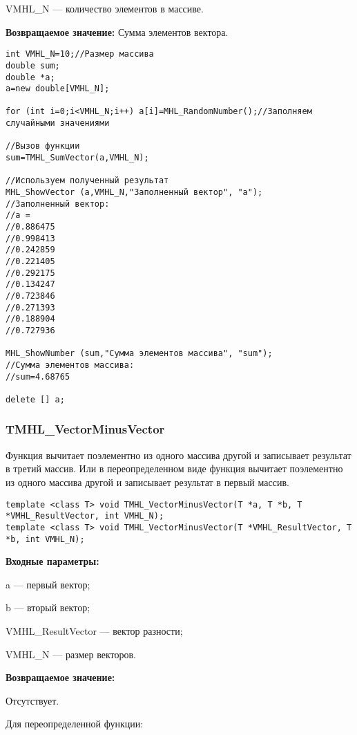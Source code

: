 \documentclass[a4paper,12pt]{article}
\begin{document}
 VMHL\_N --- количество элементов в массиве.

\textbf{Возвращаемое значение:}
Сумма элементов вектора.


\begin{lstlisting}[label=code_use_TMHL_SumVector,caption=Пример использования]
int VMHL_N=10;//Размер массива
double sum;
double *a;
a=new double[VMHL_N];

for (int i=0;i<VMHL_N;i++) a[i]=MHL_RandomNumber();//Заполняем случайными значениями

//Вызов функции
sum=TMHL_SumVector(a,VMHL_N);

//Используем полученный результат
MHL_ShowVector (a,VMHL_N,"Заполненный вектор", "a");
//Заполненный вектор:
//a =
//0.886475
//0.998413
//0.242859
//0.221405
//0.292175
//0.134247
//0.723846
//0.271393
//0.188904
//0.727936

MHL_ShowNumber (sum,"Сумма элементов массива", "sum");
//Сумма элементов массива:
//sum=4.68765

delete [] a;
\end{lstlisting}

\subsubsection{TMHL\_VectorMinusVector}\label{TMHL_VectorMinusVector}

Функция вычитает поэлементно из одного массива другой и записывает результат в третий массив. Или в переопределенном виде функция вычитает поэлементно из одного массива другой и записывает результат в первый массив.


\begin{lstlisting}[label=code_syntax_TMHL_VectorMinusVector,caption=Синтаксис]
template <class T> void TMHL_VectorMinusVector(T *a, T *b, T *VMHL_ResultVector, int VMHL_N);
template <class T> void TMHL_VectorMinusVector(T *VMHL_ResultVector, T *b, int VMHL_N);
\end{lstlisting}

\textbf{Входные параметры:}

  a --- первый вектор;
  
 b --- вторый вектор;
 
 VMHL\_ResultVector --- вектор разности;
 
 VMHL\_N --- размер векторов.

\textbf{Возвращаемое значение:}

Отсутствует.

Для переопределенной функции:
\end{document}
